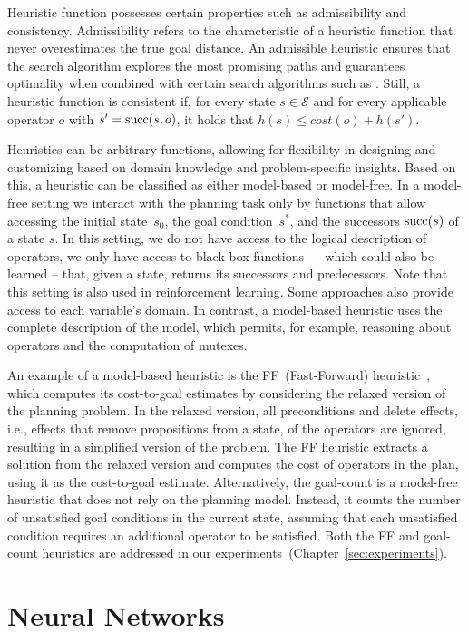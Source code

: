 Heuristic function possesses certain properties such as admissibility and consistency. Admissibility refers to the characteristic of a heuristic function that never overestimates the true goal distance. An admissible heuristic ensures that the search algorithm explores the most promising paths and guarantees optimality when combined with certain search algorithms such as \astar. Still, a heuristic function is consistent if, for every state $s \in \mathcal{S}$ and for every applicable operator $o$ with $s' = \operatorname{succ}(s,o)$, it holds that $h(s) \leq cost(o) + h(s')$.

Heuristics can be arbitrary functions, allowing for flexibility in designing and customizing based on domain knowledge and problem-specific insights. Based on this, a heuristic can be classified as either model-based or model-free. In a model-free setting we interact with the planning task only by functions that allow accessing the initial state~$s_0$, the goal condition~$s^*$, and the successors $\operatorname{succ}(s)$ of a state $s$. In this setting, we do not have access to the logical description of operators, we only have access to black-box functions~\cite{Sturtevant2019} -- which could also be learned -- that, given a state, returns its successors and predecessors. Note that this setting is also used in reinforcement learning. Some approaches also provide access to each variable's domain. In contrast, a model-based heuristic uses the complete description of the model, which permits, for example, reasoning about operators and the computation of mutexes.

An example of a model-based heuristic is the FF~(Fast-Forward) heuristic~\cite{Hoffmann.Nebel/2001}, which computes its cost-to-goal estimates by considering the relaxed version of the planning problem. In the relaxed version, all preconditions and delete effects, i.e., effects that remove propositions from a state, of the operators are ignored, resulting in a simplified version of the problem. The FF heuristic extracts a solution from the relaxed version and computes the cost of operators in the plan, using it as the cost-to-goal estimate. Alternatively, the goal-count is a model-free heuristic that does not rely on the planning model. Instead, it counts the number of unsatisfied goal conditions in the current state, assuming that each unsatisfied condition requires an additional operator to be satisfied. Both the FF and goal-count heuristics are addressed in our experiments~(Chapter~\ref{sec:experiments}).

\section{Neural Networks}
\label{sec:background_neuralnetworks}

